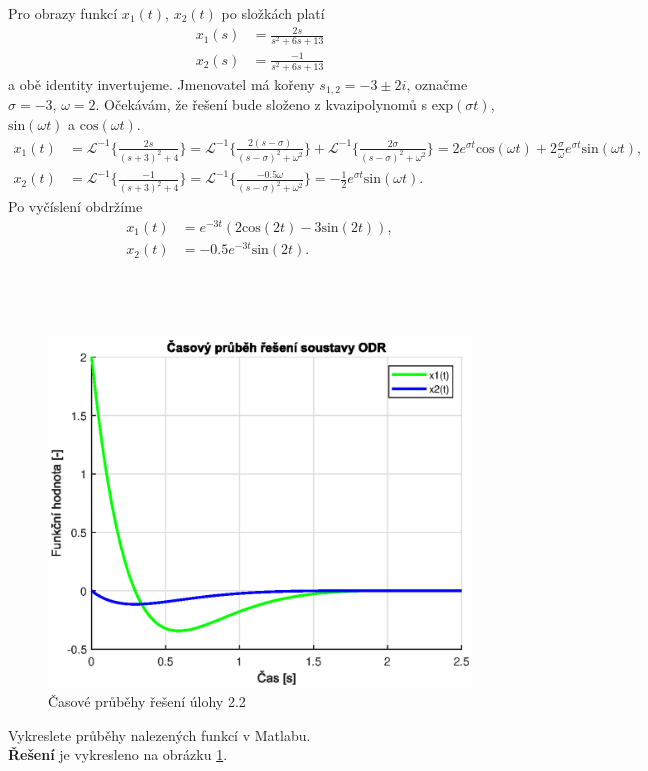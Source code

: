 \documentclass[twoside]{article}
\begin{document}
Pro obrazy funkcí $x_1(t)$, $x_2(t)$ po složkách platí
\begin{equation*}
	\begin{split}
		x_1(s) &= \frac{2s}{s^2 + 6s + 13} \\
		x_2(s) &= \frac{-1}{s^2 + 6s + 13}
	\end{split}
\end{equation*}
a obě identity invertujeme. Jmenovatel má kořeny $s_{1,2} = -3 \pm 2i$, označme $\sigma = -3$, $\omega = 2$. Očekávám, že řešení bude složeno 
z kvazipolynomů s $\text{exp}(\sigma t)$, $\text{sin}(\omega t)$ a $\text{cos}(\omega t)$.
\begin{equation*}
	\begin{split}
		x_1(t) &= \mathcal{L}^{-1}\{\frac{2s}{(s+3)^2 + 4}\} = \mathcal{L}^{-1}\{\frac{2(s - \sigma)}{(s-\sigma)^2 + \omega^2}\} + \mathcal{L}^{-1}\{\frac{2\sigma}{(s-\sigma)^2 + \omega^2}\} = 
		2 e^{\sigma t} \text{cos}(\omega t) + 2 \frac{\sigma}{\omega} e^{\sigma t} \text{sin}(\omega t),\\
		x_2(t) &= \mathcal{L}^{-1}\{\frac{-1}{(s+3)^2 + 4}\} = \mathcal{L}^{-1}\{\frac{-0.5 \omega}{(s-\sigma)^2 + \omega^2}\} = -\frac{1}{2} e^{\sigma t} \text{sin}(\omega t).
	\end{split}
\end{equation*}
Po vyčíslení obdržíme
\begin{equation*}
	\begin{split}
		x_1(t) &= e^{-3t}(2\text{cos}(2t) -3 \text{sin}(2t)), \\
		x_2(t) &= -0.5 e^{-3t}\text{sin}(2t).
	\end{split}
\end{equation*}

\subsection{~}
\begin{figure}[htbp]
	\includegraphics{solution22.eps}
	\caption{Časové průběhy řešení úlohy 2.2}
	\label{fig:reseni22}
\end{figure}
Vykreslete průběhy nalezených funkcí v Matlabu. \\
\textbf{Řešení} je vykresleno na obrázku \ref{fig:reseni22}.
\end{document}
